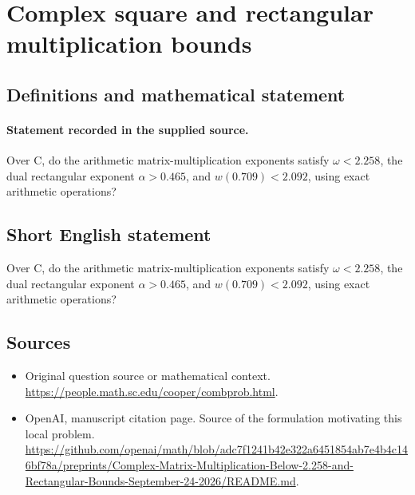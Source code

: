 \documentclass[11pt]{article}
\begin{document}
\section*{Complex square and rectangular multiplication bounds}\label{statement}
\subsection{Definitions and mathematical statement}
\paragraph{Statement recorded in the supplied source.}
Over C, do the arithmetic matrix-multiplication exponents satisfy $\omega <2.258$, the dual rectangular exponent $\alpha >0.465$, and $w(0.709)<2.092$, using exact arithmetic operations?
\subsection{Short English statement}
Over C, do the arithmetic matrix-multiplication exponents satisfy $\omega <2.258$, the dual rectangular exponent $\alpha >0.465$, and $w(0.709)<2.092$, using exact arithmetic operations?
\subsection{Sources}
\begin{itemize}
\item[S1] Original question source or mathematical context.
\url{https://people.math.sc.edu/cooper/combprob.html}.
\item[S2] OpenAI, manuscript citation page. Source of the formulation motivating this local problem.
\url{https://github.com/openai/math/blob/adc7f1241b42e322a6451854ab7e4b4c146bf78a/preprints/Complex-Matrix-Multiplication-Below-2.258-and-Rectangular-Bounds-September-24-2026/README.md}.
\end{itemize}
\end{document}
